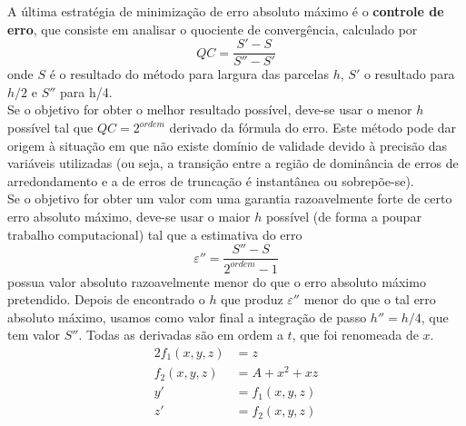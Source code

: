 A última estratégia de minimização de erro absoluto máximo é o \textbf{controle de erro}, que consiste em analisar o quociente de convergência, calculado por
\begin{equation*}
	QC=\frac{S'-S}{S''-S'}
\end{equation*}
onde $S$ é o resultado do método para largura das parcelas $h$, $S'$ o resultado para $h/2$ e $S''$ para h/4.\\ Se o objetivo for obter o melhor resultado possível, deve-se usar o menor $h$ possível tal que $QC = 2^{ordem}$ derivado da fórmula do erro. Este método pode dar origem à situação em que não existe domínio de validade devido à precisão das variáveis utilizadas (ou seja, a transição entre a região de dominância de erros de arredondamento e a de erros de truncação é instantânea ou sobrepõe-se).\\
Se o objetivo for obter um valor com uma garantia razoavelmente forte de certo erro absoluto máximo, deve-se usar o maior $h$ possível (de forma a poupar trabalho computacional) tal que a estimativa do erro
\begin{equation*}
\varepsilon '' = \frac{S''-S}{2^{ordem}-1}
\end{equation*}
possua valor absoluto razoavelmente menor do que o erro absoluto máximo pretendido. Depois de encontrado o $h$ que produz $\varepsilon ''$ menor do que o tal erro absoluto máximo, usamos como valor final a integração de passo $h''=h/4$, que tem valor $S''$.
Todas as derivadas são em ordem a $t$, que foi renomeada de $x$.
\begin{alignat*}{2}
	f_1(x,y,z)&=z\\	
	f_2(x,y,z)&=A+x^2+xz\\	
	y'&=f_1(x,y,z)\\	
	z'&=f_2(x,y,z)
\end{alignat*}
%
